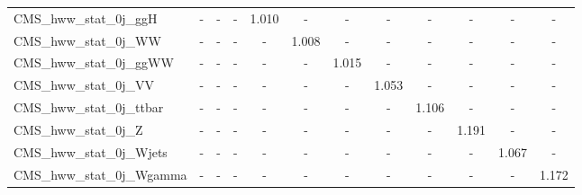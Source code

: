 \begin{table}[!ht]
\begin{center}
{\begin{tabular}{l|c|c|c|c|c|c|c|c|c|c|c|}
CMS\_hww\_stat\_0j\_ggH           &   -   &   -   &   -   & 1.010 &   -   &   -   &   -   &   -   &   -   &   -   &   -   \\
CMS\_hww\_stat\_0j\_WW            &   -   &   -   &   -   &   -   & 1.008 &   -   &   -   &   -   &   -   &   -   &   -   \\
CMS\_hww\_stat\_0j\_ggWW          &   -   &   -   &   -   &   -   &   -   & 1.015 &   -   &   -   &   -   &   -   &   -   \\
CMS\_hww\_stat\_0j\_VV            &   -   &   -   &   -   &   -   &   -   &   -   & 1.053 &   -   &   -   &   -   &   -   \\
CMS\_hww\_stat\_0j\_ttbar         &   -   &   -   &   -   &   -   &   -   &   -   &   -   & 1.106 &   -   &   -   &   -   \\
CMS\_hww\_stat\_0j\_Z             &   -   &   -   &   -   &   -   &   -   &   -   &   -   &   -   & 1.191 &   -   &   -   \\
CMS\_hww\_stat\_0j\_Wjets         &   -   &   -   &   -   &   -   &   -   &   -   &   -   &   -   &   -   & 1.067 &   -   \\
CMS\_hww\_stat\_0j\_Wgamma        &   -   &   -   &   -   &   -   &   -   &   -   &   -   &   -   &   -   &   -   & 1.172 \\
\hline
\end{tabular}
}
\end{center}
\end{table}

\clearpage